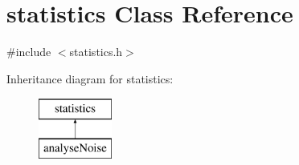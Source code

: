 \hypertarget{classstatistics}{\section{statistics Class Reference}
\label{classstatistics}
}


{\ttfamily \#include $<$statistics.\-h$>$}

Inheritance diagram for statistics\-:\begin{figure}[H]
\begin{center}
\leavevmode
\includegraphics[height=2.000000cm]{classstatistics}
\end{center}
\end{figure}
